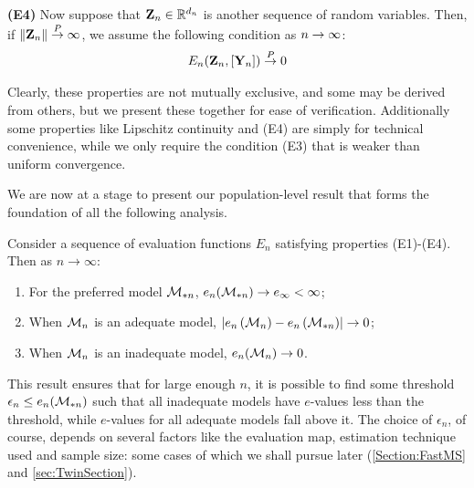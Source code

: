 \noindent\textbf{(E4)}
Now suppose that ${\mathbf{Z}}_{n} \in {\mathbb{R}}^{d_{n}}$ is another sequence of random variables. Then, if $\| {\mathbf{Z}}_{n} \| \stackrel{P}{\rightarrow} \infty$, we assume the following condition as $n \rightarrow \infty$:
%
\begin{align} 
 E_{n}  ( {\mathbf{Z}}_{n}, [{\mathbf{Y}}_{n}]  ) \stackrel{P}{\rightarrow} 0 
\end{align}

Clearly, these properties are not mutually exclusive, and some may be derived from others, but we present these together for ease of verification. Additionally some properties like Lipschitz continuity and (E4) are simply for technical convenience, while we only require the condition (E3) that is weaker than uniform convergence.

We are now at a stage to present our population-level result that forms the foundation of all the following analysis.

\begin{Theorem}\label{Theorem:ThmRightWrong}
Consider a sequence of evaluation functions $E_n$ satisfying properties (E1)-(E4). Then as $n \rightarrow \infty$:

\begin{enumerate}
\item For the preferred model ${\cal{M}}_{* n}$, $e_n ( {\cal{M}}_{* n}) \rightarrow e_\infty < \infty$;

\item When ${\cal{M}}_n$ is an adequate model, $\left| e_n \left( {\cal{M}}_n \right) - e_n \left( {\cal{M}}_{* n} \right) \right| \rightarrow 0$;

\item When ${\cal{M}}_n$ is an inadequate model, $e_n ({\cal{M}}_n) \rightarrow 0$.
\end{enumerate}
\end{Theorem}

This result ensures that for large enough $n$, it is possible to find some threshold $\epsilon_n \leq e_n ({\cal{M}}_{* n})$ such that all inadequate models have $e$-values less than the threshold, while $e$-values for all adequate models fall above it. The choice of $\epsilon_n$, of course, depends on several factors like the evaluation map, estimation technique used and sample size: some cases of which we shall pursue later (\ref{Section:FastMS} and \ref{sec:TwinSection}).